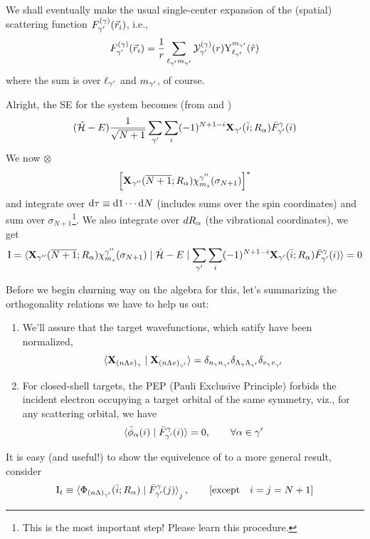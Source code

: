 \documentclass[aps,pra,groupedaddress,12pt,
               amsfonts,amssymb,
               preprint
    ]{revtex4}
\begin{document}
We shall eventually make the usual single-center expansion of the
(spatial) scattering function $F_{\gamma'}^{(\gamma)}(\vec{r}_{i})$, i.e.,
\begin{equation}
  \label{eq:sof}
  F_{\gamma'}^{(\gamma)}(\vec{r}_{i}) = \dfrac{1}{r}\sum_{\ell_{\gamma'}m_{\gamma'}}\mathcal{Y}_{\gamma'}^{(\gamma)}(r)\mathrm{Y}_{\ell_{\gamma'}}^{m_{\gamma'}}(\hat{r})
\end{equation}
where the sum is over $\ell_{\gamma'}$ and $m_{\gamma'}$, of course.

Alright, the SE for the system becomes (from  and )
\begin{equation}
  \label{eq:emsea}
  (\hat{\mathcal{H}} - E)\dfrac{1}{\sqrt{N+1}}\sum_{\gamma'}\sum_i(-1)^{N+1-i}\mathbf{X}_{\gamma'}(\bar{i};R_\alpha)\bar{F}_{\gamma'}^{\gamma}(i)
\end{equation}
We now $\otimes$
\begin{equation*}
  \left[\mathbf{X}_{\gamma''}(\overline{N+1};R_\alpha)\chi_{m_s}^{\gamma''}(\sigma_{N+1})\right]^*
\end{equation*}
and integrate over $\mathrm{d}\tau\equiv \mathrm{d} 1\cdots \mathrm{d} N$ (includes sums over
the spin coordinates) and sum over $\sigma_{N+1}$\footnote{This is the
  most important step! Please learn this procedure.}. We also integrate
over $dR_\alpha$ (the vibrational coordinates), we get
\begin{equation}
  \label{eq:int1}
  \mathrm{I} =
  \mathinner{\langle{{\mathbf{X}_{\gamma''}(\overline{N+1};R_\alpha)\chi_{m_s}^{\gamma''}(\sigma_{N+1})} \mid {\hat{\mathcal{H}}- E} \mid {\sum_{\gamma'}\sum_i(-1)^{N+1-i}\mathbf{X}_{\gamma'}(\bar{i};R_\alpha)\bar{F}_{\gamma'}^{\gamma}(i)}}\rangle} = 0
\end{equation}

Before we begin churning way on the algebra for this, let's summarizing
the orthogonality relations we have to help us out:
\begin{enumerate}
\item We'll assure that the target wavefunctions, which satify 
  have been normalized, 
  \begin{equation}
    \label{eq:otme}
    \mathinner{\langle{{\mathbf{X}_{(n\Lambda v)_\gamma}} \mid {\mathbf{X}_{(n\Lambda v)_{\gamma'}}}}\rangle}=
    \delta_{n_\gamma n_{\gamma'}}
    \delta_{\Lambda_\gamma\Lambda_{\gamma'}}
    \delta_{v_\gamma v_{\gamma'}}
  \end{equation}
\item For closed-shell targets, the PEP (Pauli Exclusive Principle)
  forbids the incident electron occupying a target orbital of the same
  symmetry, viz., for any scattering orbital, we have
  \begin{equation}
    \label{eq:otem}
    \mathinner{\langle{{\bar{\phi}_\alpha(i)} \mid {\bar{F}_{\gamma'}^{\gamma}(i)}}\rangle} = 0, \qquad \forall\alpha\in\gamma'
  \end{equation}
\end{enumerate}
It is easy (and useful!) to show the equivelence of  to a more
general result, consider
\begin{equation}
  \label{eq:int2}
  \mathrm{I}_t\equiv\mathinner{\langle{{\Phi_{(n\Lambda)_{\gamma'}}(\bar{i};R_\alpha)} \mid {\bar{F}_{\gamma'}^{\gamma}(j)}}\rangle}_j,
  \qquad [\text{except} \quad i=j=N+1]
\end{equation}
\end{document}
